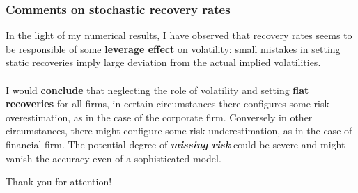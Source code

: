 \documentclass{beamer}
\begin{document}
\begin{frame}
\frametitle{Comments on stochastic recovery rates}
	In the light of my numerical results, I have observed that recovery rates seems to be responsible of some \textbf{leverage effect} on volatility: small mistakes in setting static recoveries imply large deviation from the actual implied volatilities.\\~\\

	I would \textbf{conclude} that neglecting the role of volatility and setting \textbf{flat recoveries} for all firms, in certain circumstances there configures some risk overestimation, as in the case of the corporate firm. 
	Conversely in other circumstances, there might configure some risk underestimation, as in the case of financial firm. The potential degree of \textbf{\emph{missing risk}} could be severe and might vanish the accuracy even of a sophisticated model.
\end{frame}

\begin{frame}
\Huge{\centerline{Thank you for attention!}}
\end{frame}




%
%
\end{document}
